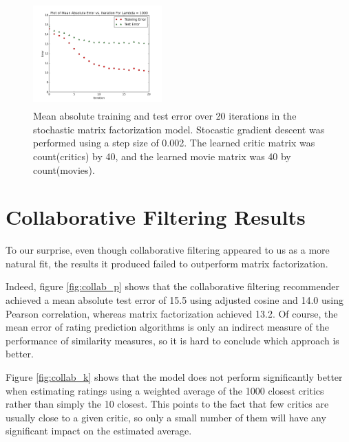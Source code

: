 \documentclass[10.5pt]{article}
\newcommand{\matrixtesterror}{13.2}
\newcommand{\factwidth}{0.44}
\newcommand{\factheight}{1.6in}
\begin{document}
\begin{figure}[H]
\includegraphics[width=0\factwidth\textwidth,height=\factheight]{matrix_plots/test-i40d40l1000.png}
\caption{Mean absolute training and test error over 20 iterations in the stochastic matrix factorization model. Stocastic gradient descent was performed using a step size of 0.002. The learned critic matrix was count(critics) by 40, and the learned movie matrix was 40 by count(movies).}
\label{fig:fac-d40}
\end{figure}



\section{Collaborative Filtering Results}

To our surprise, even though collaborative filtering appeared to us as a more
natural fit, the results it produced failed to outperform matrix factorization.

Indeed, figure \ref{fig:collab_p}  shows that the collaborative filtering
recommender achieved a mean absolute test
error of 15.5 using adjusted cosine and 14.0 using Pearson correlation, whereas
matrix factorization achieved \matrixtesterror. Of course, the mean error of
rating prediction algorithms is only an indirect measure of the performance of
similarity measures, so it is hard to conclude which approach is better.

Figure \ref{fig:collab_k} shows that the model does not perform significantly
better when estimating ratings using
a weighted average of the 1000 closest critics rather than simply the 10
closest. This points to the fact that few critics are usually close to a given
critic, so only a small number of them will have any significant impact on
the estimated average.
\end{document}
